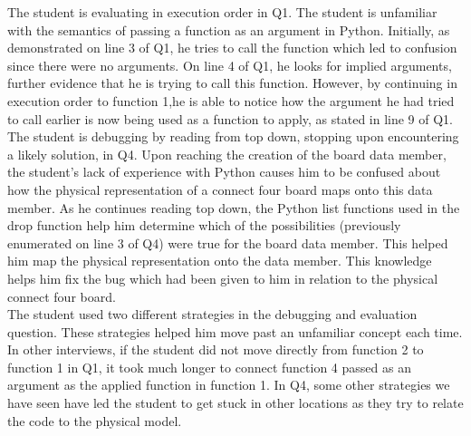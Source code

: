 The student is evaluating in execution order in Q1.
The student is unfamiliar with the semantics of passing a function as an argument in Python.
Initially, as demonstrated on line 3 of Q1, he tries to call the function which led to confusion since there were no arguments. On line 4 of Q1, he looks for implied arguments, further evidence that he is trying to call this function.
However, by continuing in execution order to function 1,he is able to notice how the argument he had tried to call earlier is now being used as a function to apply, as stated in line 9 of Q1.  \\

The student is debugging by reading from top down, stopping upon encountering a likely solution, in Q4.
Upon reaching the creation of the board data member, the student's lack of experience with Python causes him to be confused about how the physical representation of a connect four board maps onto this data member.
As he continues reading top down, the Python list functions used in the drop function help him determine which of the possibilities (previously enumerated on line 3 of Q4) were true for the board data member.
This helped him map the physical representation onto the data member.
This knowledge helps him fix the bug which had been given to him in relation to the physical connect four board.  \\

The student used two different strategies in the debugging and evaluation question.
These strategies helped him move past an unfamiliar concept each time. 
In other interviews, if the student did not move directly from function 2 to function 1 in Q1, it took much longer to connect function 4 passed as an argument as the applied function in function 1.
In Q4, some other strategies we have seen have led the student to get stuck in other locations as they try to relate the code to the physical model. 







